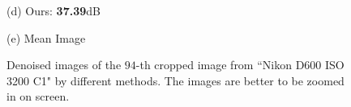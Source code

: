 \documentclass[10pt,twocolumn,letterpaper]{article}
\begin{document}
\begin{figure}
{\begin{minipage}[t]{0.195\textwidth}
{\footnotesize (d) Ours: \textbf{37.39}dB }
\end{minipage}
\begin{minipage}[t]{0.195\textwidth}
\centering
{}
{\footnotesize (e) Mean Image \cite{crosschannel2016}}
\end{minipage}
}
\caption{Denoised images of the $94$-th cropped image from ``Nikon D600 ISO 3200 C1" \cite{crosschannel2016} by different methods. The images are better to be zoomed in on screen.}
\vspace{-3mm}
\label{fig3}
\end{figure}
\end{document}
